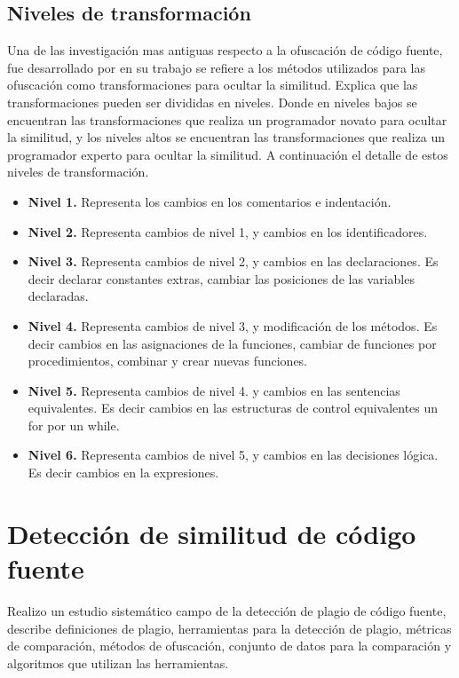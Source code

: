 \subsection{Niveles de transformación}
Una de las investigación mas antiguas respecto a la ofuscación de código fuente, fue desarrollado por \cite{Faidhi1987} en su trabajo se refiere a los métodos utilizados para las ofuscación como transformaciones para ocultar la similitud. Explica que las transformaciones pueden ser divididas en niveles. Donde en niveles bajos se encuentran las transformaciones que realiza un programador novato para ocultar la similitud, y los niveles altos se encuentran las transformaciones que realiza un programador experto para ocultar la similitud. A continuación el detalle de estos niveles de transformación.
\begin{itemize}
  \item \textbf{Nivel 1.} Representa los cambios en los comentarios e indentación.
  \item \textbf{Nivel 2.} Representa cambios de nivel 1, y cambios en los identificadores.
  \item \textbf{Nivel 3.} Representa cambios de nivel 2, y cambios en las declaraciones. Es decir declarar constantes extras, cambiar las posiciones de las variables declaradas.
  \item \textbf{Nivel 4.} Representa cambios de nivel 3, y modificación de los métodos. Es decir cambios en las asignaciones de la funciones, cambiar de funciones por procedimientos, combinar y crear nuevas funciones.
  \item \textbf{Nivel 5.} Representa cambios de nivel 4. y cambios en las sentencias equivalentes. Es decir cambios en las estructuras de control equivalentes un for por un while.
  \item \textbf{Nivel 6.} Representa cambios de nivel 5, y cambios en las decisiones lógica. Es decir cambios en la expresiones.
\end{itemize}

\section{Detección de similitud de código fuente}
\cite{Novak2019} Realizo un estudio sistemático campo de la detección de plagio de código fuente, describe definiciones de plagio, herramientas para la detección de plagio, métricas de comparación, métodos de ofuscación, conjunto de datos para la comparación y algoritmos que utilizan las herramientas.
